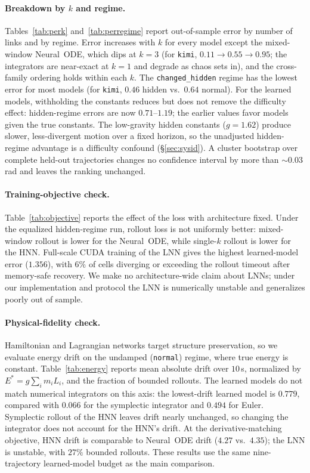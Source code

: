 \documentclass{article}
\begin{document}
\paragraph{Breakdown by $k$ and regime.}
Tables~\ref{tab:perk} and~\ref{tab:perregime} report out-of-sample error by
number of links and by regime. Error increases with $k$ for every model except the mixed-window
Neural~ODE, which dips at $k{=}3$ (for \texttt{kimi}, $0.11\to0.55\to0.95$; the integrators
are near-exact at $k{=}1$ and degrade as chaos sets in), and the cross-family ordering holds
within each $k$. The
\texttt{changed\_hidden} regime has the lowest error for most models (for
\texttt{kimi}, $0.46$ hidden vs.\ $0.64$ normal). For the learned models, withholding the
constants reduces but does not remove the difficulty effect: hidden-regime errors
are now $0.71$--$1.19$; the earlier values favor models given the true constants. The
low-gravity hidden constants ($g{=}1.62$) produce slower, less-divergent motion over a fixed
horizon, so the unadjusted hidden-regime advantage is a difficulty confound
(\S\ref{sec:sysid}). A cluster bootstrap over complete held-out trajectories changes no
confidence interval by more than ${\sim}0.03$\,rad and leaves the ranking unchanged.

\paragraph{Training-objective check.}
Table~\ref{tab:objective} reports the effect of the loss with architecture fixed. Under the
equalized hidden-regime run, rollout loss is not uniformly better: mixed-window rollout
is lower for the Neural~ODE, while single-$k$ rollout is lower for the HNN. Full-scale CUDA
training of the LNN gives the highest learned-model error ($1.356$), with $6\%$ of cells
diverging or exceeding the rollout timeout after memory-safe recovery. We make no
architecture-wide claim about LNNs; under our implementation and protocol the LNN is
numerically unstable and generalizes poorly out of sample.

\paragraph{Physical-fidelity check.}
Hamiltonian and Lagrangian networks target structure preservation, so we evaluate energy
drift on the undamped (\texttt{normal}) regime, where true energy is constant. Table~\ref{tab:energy}
reports mean absolute drift over $10$\,s, normalized by $E^{*}{=}g\sum_i m_i L_i$, and the
fraction of bounded rollouts. The learned models do not match numerical integrators on this
axis: the lowest-drift learned model is $0.779$, compared with $0.066$ for the symplectic
integrator and $0.494$ for Euler. Symplectic rollout of the HNN leaves drift nearly unchanged,
so changing the integrator does not account for the HNN's drift. At the derivative-matching
objective, HNN drift is comparable to Neural~ODE drift ($4.27$ vs.\ $4.35$); the LNN is
unstable, with $27\%$ bounded rollouts.
These results use the same nine-trajectory learned-model budget as the main comparison.
\end{document}
